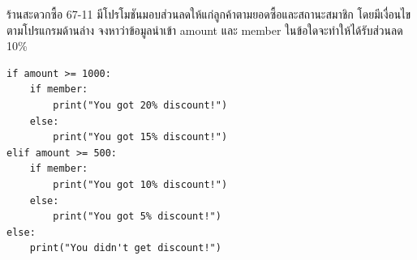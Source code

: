 \question ร้านสะดวกซื้อ 67-11 มีโปรโมชันมอบส่วนลดให้แก่ลูกค้าตามยอดซื้อและสถานะสมาชิก โดยมีเงื่อนไขตามโปรแกรมด้านล่าง \newline
จงหาว่าข้อมูลนำเข้า amount และ member ในข้อใดจะทำให้ได้รับส่วนลด 10\%
\begin{verbatim}
if amount >= 1000:
    if member:
        print("You got 20% discount!")
    else:
        print("You got 15% discount!")
elif amount >= 500:
    if member:
        print("You got 10% discount!")
    else:
        print("You got 5% discount!")
else:
    print("You didn't get discount!")
\end{verbatim}

